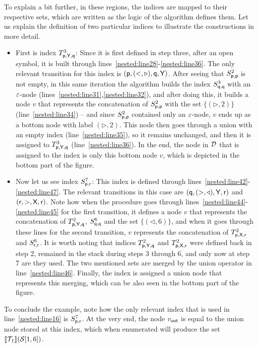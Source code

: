\begin{example}
	To explain a bit further, in these regions, the indices are mapped to their respective sets, which are written as the logic of the algorithm defines them. Let us explain the definition of two particular indices to illustrate the constructions in more detail.
	\begin{itemize}
		\item First is index $T^{3}_{{\sf p},\sf{Y},{\sf q}}$: Since it is first defined in step three, after an open symbol, it is built through lines~\ref{nested:line28}-\ref{nested:line36}. The only relevant transition for this index is $({\sf p}, ({\sf <}, \triangleright), {\sf q}, {\sf Y})$. After seeing that $S^2_{{\sf p}, {\sf p}}$ is not empty, in this same iteration the algorithm builds the index $S^3_{{\sf q}, {\sf q}}$ with an $\varepsilon$-node (lines~\ref{nested:line31},\ref{nested:line32}), and after doing this, it builds a node $v$ that represents the concatenation of $S^2_{{\sf p}, {\sf p}}$ with the set $\{(\triangleright, 2)\}$ (line~\ref{nested:line34}) -- and since $S^2_{{\sf p}, {\sf p}}$ contained only an $\varepsilon$-node, $v$ ends up as a bottom node with label $(\triangleright, 2)$. This node then goes through a union with an empty index (line~\ref{nested:line35}), so it remains unchanged, and then it is assigned to $T^{3}_{{\sf p},\sf{Y},{\sf q}}$ (line~\ref{nested:line36}). In the end, the node in $\mathcal{D}$ that is assigned to the index is only this bottom node $v$, which is depicted in the bottom part of the figure.
		\item Now let us see index $S^{7}_{{\sf p}, {\sf r}}$: This index is defined through lines~\ref{nested:line42}-\ref{nested:line47}. The relevant transitions in this case are $({\sf q},({\sf >}, \triangleleft), {\sf Y}, {\sf r})$ and $({\sf r},{\sf >}, {\sf X}, {\sf r})$. Note how when the procedure goes through lines~\ref{nested:line44}-\ref{nested:line45} for the first transition, it defines 
		a node $v$ that represents the concatenation of $T^2_{{\sf p},{\sf Y},{\sf q}}$, $S^6_{{\sf q},{\sf q}}$ and the set $\{(\triangleleft, 6)\}$, and when it goes through these lines for the second transition, $v$ represents the concatenation of $T^2_{{\sf p},{\sf X},{\sf r}}$ and $S^6_{{\sf r},{\sf r}}$. It is worth noting that indices $T^2_{{\sf p},{\sf Y},{\sf q}}$ and $T^2_{{\sf p},{\sf X},{\sf r}}$ were defined back in step 2, remained in the stack during steps 3 through 6, and only now at step 7 are they used. The two mentioned sets are merged by the union operator in line~\ref{nested:line46}. Finally, the index is assigned a union node that represents this merging, which can be also seen in the bottom part of the figure.
		
	\end{itemize}
	
	To conclude the example, note how the only relevant index that is used in line~\ref{nested:line16} is $S^{7}_{{\sf p}, {\sf r}}$. At the very end, the node $v_{\sf out}$ is equal to the union node stored at this index, which when enumerated will produce the set ${\llbracket{\mathcal{T}\!_1}\rrbracket}(\mathcal{S}[1, 6])$.
\end{example}

